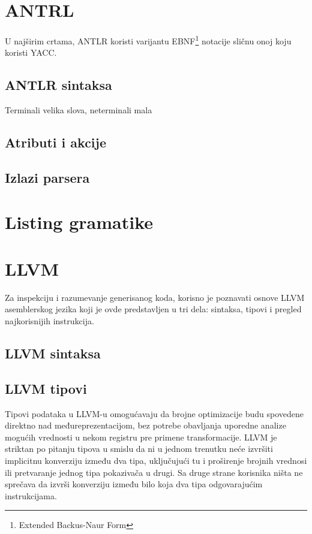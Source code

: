 
\appendix

\chapter{ANTRL}
\label{ch:antlr}

U najširim crtama, ANTLR koristi varijantu EBNF\footnote{\skr\eng Extended Backus-Naur Form} notacije sličnu onoj koju koristi YACC.

\section{ANTLR sintaksa}

Terminali velika slova, neterminali mala

\section{Atributi i akcije}

\section{Izlazi parsera}


\chapter{Listing gramatike}
\lstset{
  basicstyle=\footnotesize\ttfamily
}



\chapter{LLVM}
\label{ch:llvm}
Za inspekciju i razumevanje generisanog koda, korisno je poznavati osnove LLVM asemblerskog jezika koji je ovde predstavljen u tri dela: sintaksa, tipovi i pregled najkorisnijih instrukcija.


\section{LLVM sintaksa}



\section{LLVM tipovi}

Tipovi podataka u LLVM-u omogućavaju da brojne optimizacije budu spovedene direktno nad međureprezentacijom, 
bez potrebe obavljanja uporedne analize mogućih vrednosti u nekom registru pre primene transformacije.
LLVM je striktan po pitanju tipova u smislu da ni u jednom trenutku neće izvršiti implicitnu konverziju između dva tipa, 
uključujući tu i proširenje brojnih vrednosi ili pretvaranje jednog tipa pokazivača u drugi. 
Sa druge strane korisnika ništa ne sprečava da izvrši konverziju između bilo koja dva tipa odgovarajućim instrukcijama.

